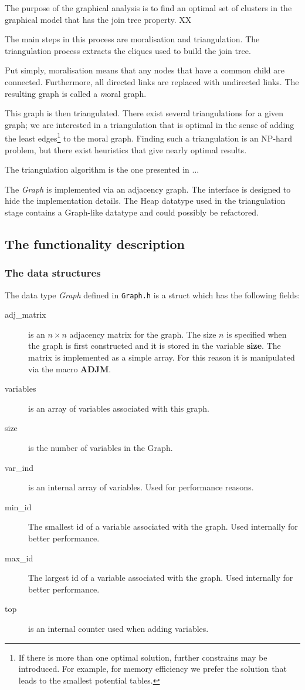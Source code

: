 \documentclass[12pt,a4paper]{report}
\newcommand{\cdatatype}[1]{{\it #1}}
\newcommand{\cparameter}[1]{\textbf{#1}}
\begin{document}
The purpose of the graphical analysis is to find an optimal set of
clusters in the graphical model that has the join tree property. XX

The main steps in this process are moralisation and triangulation. The
triangulation process extracts the cliques used to build the join tree.
 
Put simply, moralisation means that any nodes that have a common child
are connected. Furthermore, all directed links are replaced with
undirected links. The resulting graph is called a {\textit moral
graph}.

This graph is then triangulated. There exist several triangulations
for a given graph; we are interested in a triangulation that is
optimal in the sense of adding the least edges\footnote{If there is
more than one optimal solution, further constrains may be
introduced. For example, for memory efficiency we prefer the solution
that leads to the smallest potential tables.} to the moral
graph. Finding such a triangulation is an NP-hard problem, but there
exist heuristics that give nearly optimal results.

The triangulation algorithm is the one presented in ... 

The \cdatatype{Graph} is implemented via an adjacency graph. The
interface is designed to hide the implementation details. The Heap
datatype used in the triangulation stage contains a Graph-like
datatype and could possibly be refactored.


\subsection{The functionality description}
\subsubsection{The data structures}
The data type \cdatatype{Graph} defined in \verb+Graph.h+ is a
struct which has the following fields:
\begin{description}
\item[adj\_matrix] is an $n\times n$ adjacency matrix for the
graph. The size $n$ is specified when the graph is first constructed
and it is stored in the variable \cparameter{size}. The matrix is
implemented as a simple array. For this reason it is manipulated via
the macro \cparameter{ADJM}.
\item[variables] is an array of variables associated with this graph.
\item[size] is the number of variables in the Graph.
\item[var\_ind] is an internal array of variables. Used for
performance reasons.
\item[min\_id] The smallest id of a variable associated with the
graph. Used internally for better performance.
\item[max\_id] The largest id of a variable associated with the
graph. Used internally for better performance.
\item[top] is an internal counter used when adding variables. 
\end{description}
\end{document}
